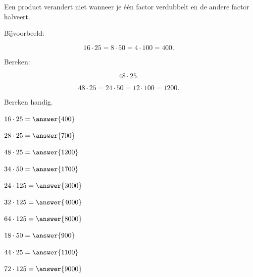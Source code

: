 \documentclass{ximera}
\begin{document}


Een product verandert niet wanneer je één factor verdubbelt en de andere
factor halveert.

Bijvoorbeeld:

\[
16\cdot25
=
8\cdot50
=
4\cdot100
=
400.
\]


\begin{voorbeeld}

Bereken:

\[
48\cdot25.
\]

\[
48\cdot25
=
24\cdot50
=
12\cdot100
=
1200.
\]

\end{voorbeeld}


\begin{oefening}{\oefB\ESS}

Bereken handig.

\begin{question} \(16\cdot25=\answer{400}\) \end{question}

\begin{question} \(28\cdot25=\answer{700}\) \end{question}

\begin{question} \(48\cdot25=\answer{1200}\) \end{question}

\begin{question} \(34\cdot50=\answer{1700}\) \end{question}

\begin{question} \(24\cdot125=\answer{3000}\) \end{question}

\begin{question} \(32\cdot125=\answer{4000}\) \end{question}

\begin{question} \(64\cdot125=\answer{8000}\) \end{question}

\begin{question} \(18\cdot50=\answer{900}\) \end{question}

\begin{question} \(44\cdot25=\answer{1100}\) \end{question}

\begin{question} \(72\cdot125=\answer{9000}\) \end{question}

\end{oefening}
\end{document}
